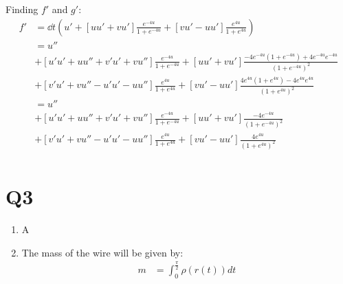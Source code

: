 \documentclass[a4paper, 11pt]{article}
\begin{document}
\begin{enumerate}[label=(\alph*)]
        \begin{mdframed}

          Finding $f'$ and $g'$:
          \begin{align*}
            f' & = \dd{}t \left(
            u'
            + \left[ uu' + vu' \right]\frac{e^{-4u}}{1+e^{-4u}}
            + \left[ vu' - uu' \right]\frac{e^{4u}}{1+e^{4u}}
            \right)                                                                              \\
               & =   u''                                                                         \\
               & + \left[ u'u' +uu'' + v'u'+vu'' \right]\frac{e^{-4u}}{1+e^{-4u}}
            + \left[ uu' + vu' \right]\frac{-4e^{-4u}(1+e^{-4u})+4e^{-4u}e^{-4u}}{(1+e^{-4u})^2} \\
               & + \left[ v'u' + vu'' - u'u' -uu'' \right]\frac{e^{4u}}{1+e^{4u}}
            + \left[ vu' - uu' \right]\frac{4e^{4u}(1+e^{4u})-4e^{4u}e^{4u}}{(1+e^{4u})^2}       \\
               & =   u''                                                                         \\
               & + \left[ u'u' +uu'' + v'u'+vu'' \right]\frac{e^{-4u}}{1+e^{-4u}}
            + \left[ uu' + vu' \right]\frac{-4e^{-4u}}{(1+e^{-4u})^2}                            \\
               & + \left[ v'u' + vu'' - u'u' -uu'' \right]\frac{e^{4u}}{1+e^{4u}}
            + \left[ vu' - uu' \right]\frac{4e^{4u}}{(1+e^{4u})^2}                               \\
          \end{align*}

        \end{mdframed}





\end{enumerate}



\section*{Q3}
\begin{enumerate}[label=(\alph*)]
  \item A
  \item The mass of the wire will be given by:
        \begin{align*}
          m & = \int_0^{\frac{\pi}2}\rho(r(t))dt
        \end{align*}
\end{enumerate}

\end{document}
